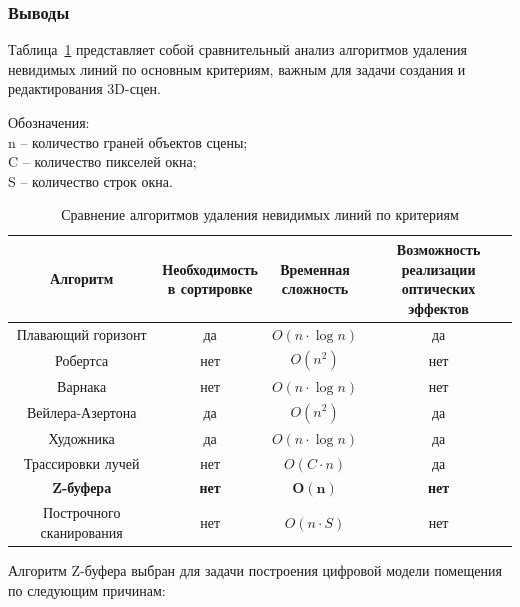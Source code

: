 \subsubsection{Выводы}

\hspace{1.25cm}
Таблица~\ref{tab:algorithm_comparison} представляет собой сравнительный анализ алгоритмов удаления невидимых линий по основным критериям, важным для задачи создания и редактирования 3D-сцен. 


Обозначения:\\
n -- количество граней объектов сцены;\\
C -- количество пикселей окна;\\
S -- количество строк окна.

\begin{table}[H]
\centering
\renewcommand{\arraystretch}{1.5}
\setlength{\tabcolsep}{10pt}
\begin{tabular}{|c|c|c|c|}
\hline
\textbf{Алгоритм} & \makecell{\textbf{Необходимость} \\ \textbf{в сортировке}} & \makecell{\textbf{Временная} \\ \textbf{сложность}} & \makecell{\textbf{Возможность реализации} \\ \textbf{оптических эффектов}} \\ \hline
Плавающий горизонт & да  & \( O(n \cdot \log n) \) & да \\ \hline
Робертса           & нет   & \( O(n^2) \)           & нет \\ \hline
Варнака            & нет   & \( O(n \cdot \log n) \) & нет \\ \hline
Вейлера-Азертона   & да  & \( O(n^2) \)           & да \\ \hline
Художника          & да   & \( O(n \cdot \log n) \) & да \\ \hline
Трассировки лучей  & нет  & \( O(C \cdot n) \)           & да \\ \hhline{|=|=|=|=|}
\textbf{Z-буфера}  & \textbf{нет} & \(\mathbf{O(n)}\) & \textbf{нет} \\ \hhline{|=|=|=|=|}
Построчного сканирования & нет & \( O(n \cdot S) \) & нет \\ \hline
\end{tabular}
\caption{Сравнение алгоритмов удаления невидимых линий по критериям}
\label{tab:algorithm_comparison}
\end{table}

Алгоритм Z-буфера выбран для задачи построения цифровой модели помещения по следующим причинам:

